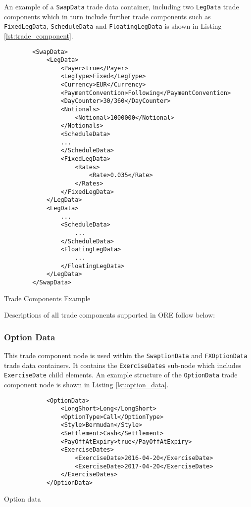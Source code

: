 \vspace{1em}

An example of a \lstinline!SwapData! trade data container, including two \lstinline!LegData! trade components which in turn include further trade components such as \lstinline!FixedLegData!, \lstinline!ScheduleData! and \lstinline!FloatingLegData! is shown in Listing \ref{lst:trade_component}.

\begin{listing}[H]
\begin{verbatim}
        <SwapData>
            <LegData>
                <Payer>true</Payer>
                <LegType>Fixed</LegType>
                <Currency>EUR</Currency>
                <PaymentConvention>Following</PaymentConvention>
                <DayCounter>30/360</DayCounter>
                <Notionals>
                    <Notional>1000000</Notional>
                </Notionals>
                <ScheduleData>
                ...
                </ScheduleData>
                <FixedLegData>
                    <Rates>
                        <Rate>0.035</Rate>
                    </Rates>
                </FixedLegData>
            </LegData>
            <LegData>
                ...
                <ScheduleData>
                    ...
                </ScheduleData>
                <FloatingLegData>
                    ...
                </FloatingLegData>
            </LegData>
        </SwapData>
\end{verbatim}
\caption{Trade Components Example}
\label{lst:trade_component}
\end{listing}

Descriptions of all trade components supported in ORE follow below:

\subsubsection{Option Data}
\label{ss:option_data} 
This trade component node is used within the \lstinline!SwaptionData! and \lstinline!FXOptionData! trade data containers. It contains the \lstinline!ExerciseDates! sub-node which includes  \lstinline!ExerciseDate! child elements. An example structure of the \lstinline!OptionData! trade component node is shown in Listing \ref{lst:option_data}.

\begin{listing}[H]
\begin{verbatim}
            <OptionData>
                <LongShort>Long</LongShort>
                <OptionType>Call</OptionType>
                <Style>Bermudan</Style>
                <Settlement>Cash</Settlement> 
                <PayOffAtExpiry>true</PayOffAtExpiry>
                <ExerciseDates>
                    <ExerciseDate>2016-04-20</ExerciseDate>
                    <ExerciseDate>2017-04-20</ExerciseDate>
                </ExerciseDates>
            </OptionData>
\end{verbatim}
\caption{Option data}
\label{lst:option_data}
\end{listing}

